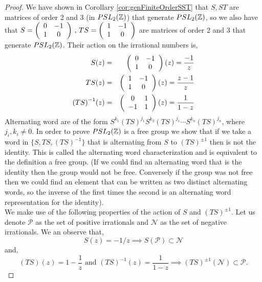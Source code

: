 \begin{proof}
We have shown in Corollary \ref{cor:genFiniteOrderSST} that $S, ST$ are matrices of order 2 and 3 (in $PSL_2(\mathbb{Z})$) that generate $PSL_2(\mathbb{Z})$, so we also have that $S = \left(\begin{array}{ c c } 0 & -1 \\ 1 & 0 \end{array} \right) \,,\, TS = \left(\begin{array}{ c c } 1 & -1 \\ 1 & 0 \end{array} \right)$ are matrices of order 2 and 3 that generate $PSL_2(\mathbb{Z})$. Their action on the irrational numbers is, 
\begin{eqnarray*}
S(z) &=& \left(\begin{array}{ c c } 0 & -1 \\ 1 & 0 \end{array} \right)(z) = \frac{-1}{z} \\
TS(z) &=& \left(\begin{array}{ c c } 1 & -1 \\ 1 & 0 \end{array} \right)(z) = \frac{z-1}{z}\\
{(TS)}^{-1}(z) &=& \left(\begin{array}{ c c } 0 & 1 \\ -1 & 1 \end{array} \right)(z) = \frac{1}{1-z}
\end{eqnarray*}
Alternating word are of the form $S^{k_1}(TS)^{j_1}S^{k_2}(TS)^{j_1}\cdots S^{k_n}(TS)^{j_n}$, where $j_i, k_i \neq 0$.
In order to prove $PSL_2(\mathbb{Z})$ is a free group we show that if we take a word in $\{S,TS,{(TS)}^{-1}\}$ that is alternating from $S$ to $(TS)^{\pm 1}$ then is not the identity. This is called the alternating word characterization and is equivalent to the definition a free group. (If we could find an alternating word that is the identity then the group would not be free. Conversely if the group was not free then we could find an element that can be written as two distinct alternating words, so the inverse of the first times the second is an alternating word representation for the identity).
\\ 
We make use of the following properties of the action of $S$ and ${(TS)}^{\pm 1}$. Let us denote $\mathcal{P}$ as the set of positive irrationals and $\mathcal{N}$ as the set of negative irrationals. We an observe that, 
$$ S(z) = -1/z \implies S(\mathcal{P}) \subset \mathcal{N}$$
and,
$$(TS)(z) = 1 - \frac{1}{z} \text{ and } {(TS)}^{-1}(z) = \frac{1}{1-z} \implies {(TS)}^{\pm 1}(\mathcal{N}) \subset \mathcal{P}.$$

\end{proof}

